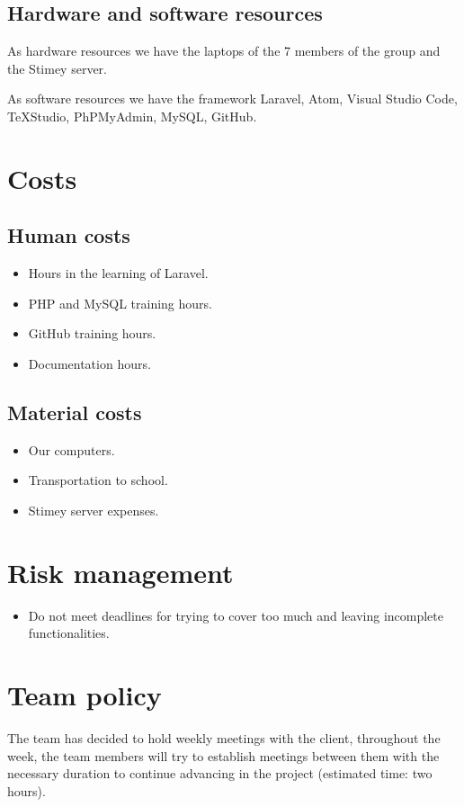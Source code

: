\subsection{Hardware and software resources}
As hardware resources we have the laptops of the 7 members of the group and the Stimey server.

As software resources we have the framework Laravel, Atom, Visual Studio Code, TeXStudio, PhPMyAdmin, MySQL, GitHub.

\section{Costs}
\subsection{Human costs}
\begin{itemize}
	\item Hours in the learning of Laravel.
	\item PHP and MySQL training hours.
	\item GitHub training hours.
	\item Documentation hours.
\end{itemize}

\subsection{Material costs}
\begin{itemize}
	\item Our computers.
	\item Transportation to school.
	\item Stimey server expenses.
\end{itemize}

\section{Risk management}
\begin{itemize}
	\item Do not meet deadlines for trying to cover too much and leaving incomplete functionalities.
\end{itemize}

\section{Team policy}
The team has decided to hold weekly meetings with the client, throughout the week, the team members will try to establish meetings between them with the necessary duration to continue advancing in the project (estimated time: two hours).


